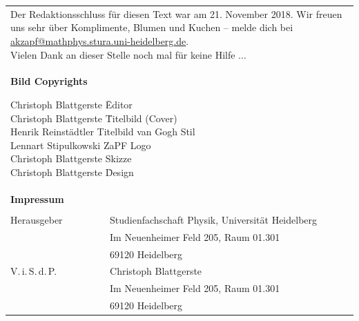 \documentclass{scrbook}
\begin{document}
\null
\newpage
{}
\vspace*{\fill}
    \begin{tabular*}{\textwidth}{ll}
        \multicolumn{2}{l}{
            \parbox{\textwidth}{
                Der Redaktionsschluss für diesen Text war am 21. November 2018. Wir freuen uns
                sehr über Komplimente, Blumen und Kuchen -- melde dich bei
                \href{mailto:akzapf@mathphys.stura.uni-heidelberg.de}{akzapf@mathphys.stura.uni-heidelberg.de}. \\
                Vielen Dank an dieser Stelle noch mal für keine Hilfe ...
            }
            \vspace{1cm}
        }\\
	\multicolumn{2}{l}{
	\parbox{0.77\textwidth}{
       	\textbf{Bild Copyrights}
       	\begin{tabbing}
        Christoph Blattgerste \quad \quad \= Editor \\
		Christoph Blattgerste \quad \quad \=  Titelbild (Cover) \\
		Henrik Reinstädtler\> Titelbild van Gogh Stil \\
		Lennart Stipulkowski \> ZaPF Logo \\
		Christoph Blattgerste\footnotemark \> Skizze \\
        Christoph Blattgerste \quad \quad \= Design
		\end{tabbing}
       	}
      }\\

        \textbf{Impressum} \\ \\
        Herausgeber & Studienfachschaft Physik, Universität Heidelberg \\
        & Im Neuenheimer Feld 205, Raum 01.301\\
        & 69120 Heidelberg\\
        V.\,i.\,S.\,d.\,P. & Christoph Blattgerste\\
        & Im Neuenheimer Feld 205, Raum 01.301\\
        & 69120 Heidelberg\\
    \end{tabular*}

    \vfill
\end{document}
